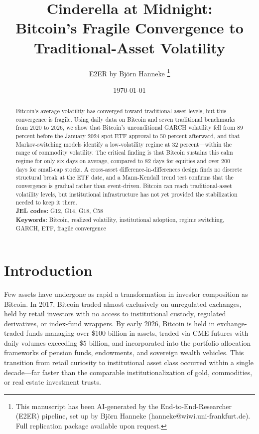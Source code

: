 \documentclass[12pt,a4paper]{article}
\title{Cinderella at Midnight: \\ Bitcoin's Fragile Convergence to Traditional-Asset Volatility}
\author{E2ER by Bj\"{o}rn Hanneke%
\footnote{This manuscript has been AI-generated by the End-to-End-Researcher
(E2ER) pipeline, set up by Bj\"{o}rn Hanneke (hanneke@wiwi.uni-frankfurt.de).
Full replication package available upon request.}}
\date{\today}
\begin{document}
\maketitle

\begin{abstract}
\noindent
Bitcoin's average volatility has converged toward traditional asset levels,
but this convergence is fragile. Using daily data on Bitcoin and seven
traditional benchmarks from 2020 to 2026, we show that Bitcoin's
unconditional GARCH volatility fell from 89 percent before the January 2024
spot ETF approval to 50 percent afterward, and that Markov-switching models
identify a low-volatility regime at 32 percent---within the range of
commodity volatility. The critical finding is that Bitcoin sustains this
calm regime for only six days on average, compared to 82 days for equities
and over 200 days for small-cap stocks. A cross-asset difference-in-differences
design finds no discrete structural break at the ETF date, and a
Mann-Kendall trend test confirms that the convergence is gradual rather
than event-driven. Bitcoin can reach traditional-asset volatility levels,
but institutional infrastructure has not yet provided the stabilization
needed to keep it there.
\\[6pt]
\textbf{JEL codes:} G12, G14, G18, C58 \\
\textbf{Keywords:} Bitcoin, realized volatility, institutional adoption, regime switching, GARCH, ETF, fragile convergence
\end{abstract}



\section{Introduction}\label{sec:intro}

Few assets have undergone as rapid a transformation in investor composition
as Bitcoin. In 2017, Bitcoin traded almost exclusively on unregulated
exchanges, held by retail investors with no access to institutional custody,
regulated derivatives, or index-fund wrappers. By early 2026, Bitcoin is
held in exchange-traded funds managing over \$100 billion in assets, traded
via CME futures with daily volumes exceeding \$5 billion, and incorporated
into the portfolio allocation frameworks of pension funds, endowments, and
sovereign wealth vehicles. This transition from retail curiosity to
institutional asset class occurred within a single decade---far faster than
the comparable institutionalization of gold, commodities, or real estate
investment trusts.
\end{document}
